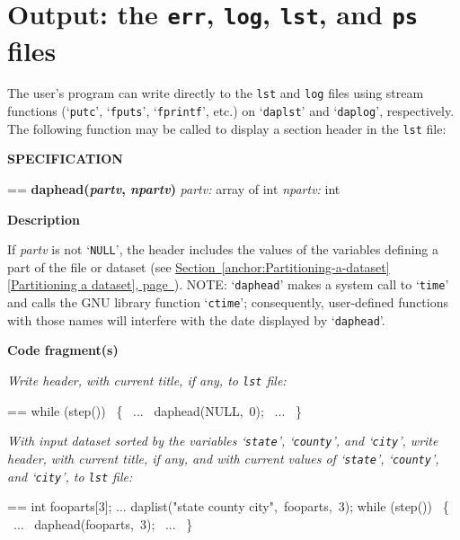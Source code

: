 \documentclass{book}
\makeatletter
\newcommand\Texinfocommandstyletextvar[1]{{\normalfont{}\textsl{#1}}}%
\newenvironment{Texinfopreformatted}{%
  \par\GNUTobeylines\obeyspaces\frenchspacing\parskip=\z@\parindent=\z@}{}
{\catcode`\^^M=13 \gdef\GNUTobeylines{\catcode`\^^M=13 \def^^M{\null\par}}}
\newenvironment{Texinfoindented}{\begin{list}{}{}\item\relax}{\end{list}}
\renewcommand{\_}{\Texinfounderscore\discretionary{}{}{}}
\makeatother
\begin{document}
\section{{Output: the \texttt{err}, \texttt{log}, \texttt{lst}, and \texttt{ps} files}}
\label{anchor:Output-files}%

The user's program can write directly to the \texttt{lst} and \texttt{log} files using
stream functions (`\texttt{putc}', `\texttt{fputs}', `\texttt{fprintf}', etc.)
on `\texttt{dap\_lst}' and `\texttt{dap\_log}', respectively.
The following function may be called to display
a section header in the \texttt{lst} file:
\index[in]{dap\_head@dap\_head}%
%
%
%

\noindent{}\textbf{SPECIFICATION}

\begin{Texinfoindented}
\begin{Texinfopreformatted}%
\textbf{dap\_head(\Texinfocommandstyletextvar{partv}, \Texinfocommandstyletextvar{npartv})}
\Texinfocommandstyletextvar{partv:} array of int
\Texinfocommandstyletextvar{npartv:} int
\end{Texinfopreformatted}
\end{Texinfoindented}

\noindent{}\textbf{Description}

If \Texinfocommandstyletextvar{partv} is not `\texttt{NULL}', the header includes
the values of the variables defining a part of the file
or dataset (see \hyperref[anchor:Partitioning-a-dataset]{Section~\ref*{anchor:Partitioning-a-dataset} [Partitioning a dataset], page~\pageref*{anchor:Partitioning-a-dataset}}).
NOTE: `\texttt{dap\_head}' makes a system call to `\texttt{time}'
and calls the GNU library function `\texttt{ctime}'; consequently,
user-defined functions with those names will interfere with
the date displayed by `\texttt{dap\_head}'.

\noindent{}\textbf{Code fragment(s)}

\emph{Write header, with current title, if any, to \texttt{lst} file:}
\begin{Texinfoindented}
\begin{Texinfopreformatted}%
\ttfamily while (step())
\  \{
\    ...
\    dap\_head(NULL,\ 0);
\    ...
\  \}
\end{Texinfopreformatted}
\end{Texinfoindented}

\emph{With input dataset sorted by
the variables `\texttt{state}', `\texttt{county}', and `\texttt{city}',
write header, with current title, if any, and with current values of
`\texttt{state}', `\texttt{county}', and `\texttt{city}',
to \texttt{lst} file:}
\begin{Texinfoindented}
\begin{Texinfopreformatted}%
\ttfamily int fooparts[3];
...
dap\_list("state county city",\ fooparts,\ 3);
while (step())
\  \{
\    ...
\    dap\_head(fooparts,\ 3);
\    ...
\  \}
\end{Texinfopreformatted}
\end{Texinfoindented}
\end{document}

